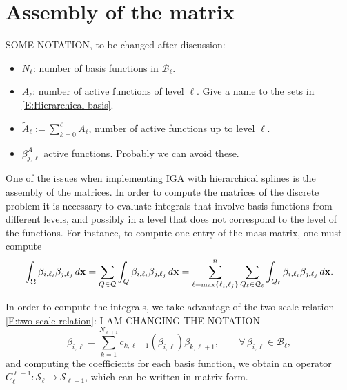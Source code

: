 \documentclass[12pt,a4paper,pdftex]{article}
\theoremstyle{plain}
\theoremstyle{definition}
\theoremstyle{remark}
\newcommand{\Rd}{\color{red}}
\newcommand{\note}[1]{{\noindent\centerline{\fbox{\parbox{.9\textwidth}{\textbf{
#1}}}}}}
\newcommand\BB{\mathcal B}
\newcommand\QQ{\mathcal Q}
\newcommand\VV{\mathcal S}
\newcommand{\bx}{{\bf x}}
\begin{document}

\section{Assembly of the matrix}
{\Rd SOME NOTATION, to be changed after discussion:
\begin{itemize}
\item $N_\ell$: number of basis functions in $\BB_\ell$.
\item $A_\ell$: number of active functions of level $\ell$. Give a name to the sets in \eqref{E:Hierarchical basis}.
\item $\tilde A_\ell := \sum_{k=0}^\ell A_\ell$, number of active functions up to level $\ell$.
\item $\beta^A_{j,\ell}$ active functions. Probably we can avoid these.
\end{itemize}
}

One of the issues when implementing IGA with hierarchical splines is the assembly of the matrices. In order to compute the matrices of the discrete problem it is necessary to evaluate integrals that involve basis functions from different levels, and possibly in a level that does not correspond to the level of the functions. For instance, to compute one entry of the mass matrix, one must compute
\begin{equation*}
\int_\Omega \beta_{i,\ell_i} \beta_{j,\ell_j} \, d\bx = \sum_{Q \in \QQ} \int_Q \beta_{i,\ell_i} \beta_{j,\ell_j} \, d\bx = \sum_{\ell = \max\{\ell_i, \ell_j\}}^n \sum_{Q_\ell \in \QQ_\ell} \int_{Q_\ell} \beta_{i,\ell_i} \beta_{j,\ell_j} \, d\bx.
\end{equation*}

In order to compute the integrals, we take advantage of the two-scale relation \eqref{E:two scale relation}: {\Rd I AM CHANGING THE NOTATION}
\begin{equation*}
 \beta_{i,\ell} = \sum_{k=1}^{N_{\ell+1}}
c_{k,\ell+1}(\beta_{i,\ell})\beta_{k,\ell+1}, 
\qquad \forall\,\beta_{i,\ell} \in\BB_\ell,
\end{equation*}
and computing the coefficients for each basis function, we obtain an operator $C_\ell^{\ell+1}: \VV_\ell \longrightarrow \VV_{\ell+1}$, which can be written in matrix form.
\end{document}
